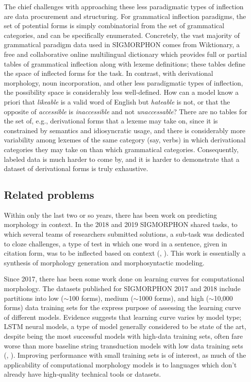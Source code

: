 The chief challenges with approaching these less paradigmatic types of inflection are data procurement and structuring. For grammatical inflection paradigms, the set of potential forms is simply combinatorial from the set of grammatical categories, and can be specifically enumerated. Concretely, the vast majority of grammatical paradigm data used in SIGMORPHON comes from Wiktionary, a free and collaborative online multilingual dictionary which provides full or partial tables of grammatical inflection along with lexeme definitions; these tables define the space of inflected forms for the task. In contrast, with derivational morphology, noun incorporation, and other less paradigmatic types of inflection, the possibility space is considerably less well-defined. How can a model know a priori that \textit{likeable} is a valid word of English but \textit{hateable} is not, or that the opposite of \textit{accessible} is \textit{inaccessible} and not \textit{unaccessable}? There are no tables for the set of, e.g., derivational forms that a lexeme may take on, since it is constrained by semantics and idiosyncratic usage, and there is considerably more variability among lexemes of the same category (say, verbs) in which derivational categories they may take on than which grammatical categories. Consequently, labeled data is much harder to come by, and it is harder to demonstrate that a dataset of derivational forms is truly exhaustive.

\subsection{Related problems}

Within only the last two or so years, there has been work on predicting morphology in context. In the 2018 and 2019 SIGMORPHON shared tasks, to which several teams of researchers submitted solutions, a sub-task was dedicated to cloze challenges, a type of test in which one word in a sentence, given in citation form, was to be inflected based on context (\cite{Cotterell2018b}, \cite{McCarthy2019}). This work is essentially a synthesis of morphology generation and morphosyntactic modeling.

Since 2017, there has been some work done on learning curves for computational morphology. The datasets published for SIGMORPHON 2017 and 2018 include partitions into low ($\sim$100 forms), medium ($\sim$1000 forms), and high ($\sim$10,000 forms) data training sets for the express purpose of assessing the learning curve of different models. Evidence suggests that learning curve varies by model type; LSTM neural models, a type of model generally considered to be state of the art, despite being the most successful models with high-data training sets, often fare worse than more baseline string transduction models with low data training sets (\cite{Cotterell2017a}, \cite{Cotterell2018b}). Improving performance with small training sets is of interest, as much of the applicability of computational morphology models is to languages which don't already have high-quality technical tools or datasets. 

